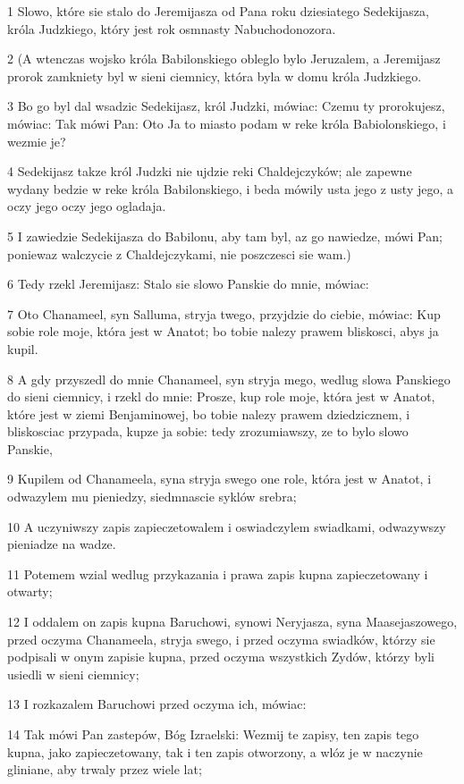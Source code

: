 \par 1 Slowo, które sie stalo do Jeremijasza od Pana roku dziesiatego Sedekijasza, króla Judzkiego, który jest rok osmnasty Nabuchodonozora.
\par 2 (A wtenczas wojsko króla Babilonskiego obleglo bylo Jeruzalem, a Jeremijasz prorok zamkniety byl w sieni ciemnicy, która byla w domu króla Judzkiego.
\par 3 Bo go byl dal wsadzic Sedekijasz, król Judzki, mówiac: Czemu ty prorokujesz, mówiac: Tak mówi Pan: Oto Ja to miasto podam w reke króla Babiolonskiego, i wezmie je?
\par 4 Sedekijasz takze król Judzki nie ujdzie reki Chaldejczyków; ale zapewne wydany bedzie w reke króla Babilonskiego, i beda mówily usta jego z usty jego, a oczy jego oczy jego ogladaja.
\par 5 I zawiedzie Sedekijasza do Babilonu, aby tam byl, az go nawiedze, mówi Pan; poniewaz walczycie z Chaldejczykami, nie poszczesci sie wam.)
\par 6 Tedy rzekl Jeremijasz: Stalo sie slowo Panskie do mnie, mówiac:
\par 7 Oto Chanameel, syn Salluma, stryja twego, przyjdzie do ciebie, mówiac: Kup sobie role moje, która jest w Anatot; bo tobie nalezy prawem bliskosci, abys ja kupil.
\par 8 A gdy przyszedl do mnie Chanameel, syn stryja mego, wedlug slowa Panskiego do sieni ciemnicy, i rzekl do mnie: Prosze, kup role moje, która jest w Anatot, które jest w ziemi Benjaminowej, bo tobie nalezy prawem dziedzicznem, i bliskosciac przypada, kupze ja sobie: tedy zrozumiawszy, ze to bylo slowo Panskie,
\par 9 Kupilem od Chanameela, syna stryja swego one role, która jest w Anatot, i odwazylem mu pieniedzy, siedmnascie syklów srebra;
\par 10 A uczyniwszy zapis zapieczetowalem i oswiadczylem swiadkami, odwazywszy pieniadze na wadze.
\par 11 Potemem wzial wedlug przykazania i prawa zapis kupna zapieczetowany i otwarty;
\par 12 I oddalem on zapis kupna Baruchowi, synowi Neryjasza, syna Maasejaszowego, przed oczyma Chanameela, stryja swego, i przed oczyma swiadków, którzy sie podpisali w onym zapisie kupna, przed oczyma wszystkich Zydów, którzy byli usiedli w sieni ciemnicy;
\par 13 I rozkazalem Baruchowi przed oczyma ich, mówiac:
\par 14 Tak mówi Pan zastepów, Bóg Izraelski: Wezmij te zapisy, ten zapis tego kupna, jako zapieczetowany, tak i ten zapis otworzony, a wlóz je w naczynie gliniane, aby trwaly przez wiele lat;
